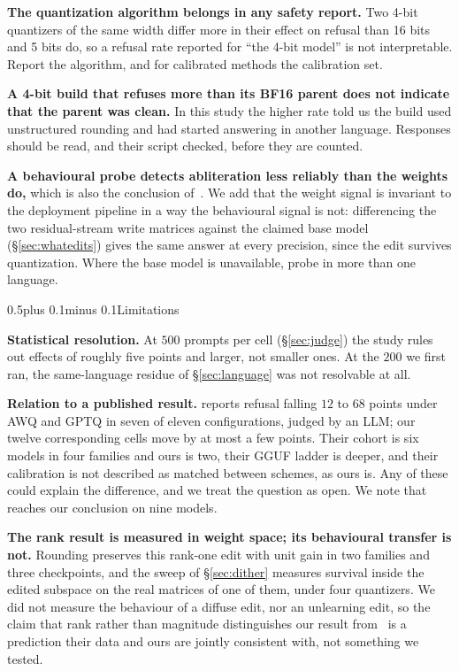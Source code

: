 \documentclass[conference,compsoc,letterpaper]{IEEEtran}
\makeatletter
\def\section{\@startsection{section}{1}{\z@}{1\baselineskip plus 0.25\baselineskip minus 0.25\baselineskip}%
{0.5\baselineskip plus 0.1\baselineskip minus 0.1\baselineskip}{\normalfont\large\bfseries}}%
\makeatother
\begin{document}
\textbf{The quantization algorithm belongs in any safety report.} Two 4-bit quantizers of the same width differ more in their effect on refusal than 16 bits and 5 bits do, so a refusal rate reported for ``the 4-bit model'' is not interpretable. Report the algorithm, and for calibrated methods the calibration set.

\textbf{A 4-bit build that refuses more than its BF16 parent does not indicate that the parent was clean.} In this study the higher rate told us the build used unstructured rounding and had started answering in another language. Responses should be read, and their script checked, before they are counted.

\textbf{A behavioural probe detects abliteration less reliably than the weights do,} which is also the conclusion of~\cite{hurtado2026audit}. We add that the weight signal is invariant to the deployment pipeline in a way the behavioural signal is not: differencing the two residual-stream write matrices against the claimed base model (\S\ref{sec:whatedits}) gives the same answer at every precision, since the edit survives quantization. Where the base model is unavailable, probe in more than one language.

\section{Limitations} \label{sec:threats}

\textbf{Statistical resolution.} At $500$ prompts per cell (\S\ref{sec:judge}) the study rules out effects of roughly five points and larger, not smaller ones. At the $200$ we first ran, the same-language residue of \S\ref{sec:language} was not resolvable at all.

\textbf{Relation to a published result.} \cite{qualitynotproxy2026} reports refusal falling $12$ to $68$ points under AWQ and GPTQ in seven of eleven configurations, judged by an LLM; our twelve corresponding cells move by at most a few points. Their cohort is six models in four families and ours is two, their GGUF ladder is deeper, and their calibration is not described as matched between schemes, as ours is. Any of these could explain the difference, and we treat the question as open. We note that~\cite{jointtemp2026} reaches our conclusion on nine models.

\textbf{The rank result is measured in weight space; its behavioural transfer is not.} Rounding preserves this rank-one edit with unit gain in two families and three checkpoints, and the sweep of \S\ref{sec:dither} measures survival inside the edited subspace on the real matrices of one of them, under four quantizers. We did not measure the behaviour of a diffuse edit, nor an unlearning edit, so the claim that rank rather than magnitude distinguishes our result from~\cite{zhang2025unlearnquant} is a prediction their data and ours are jointly consistent with, not something we tested.
\end{document}
